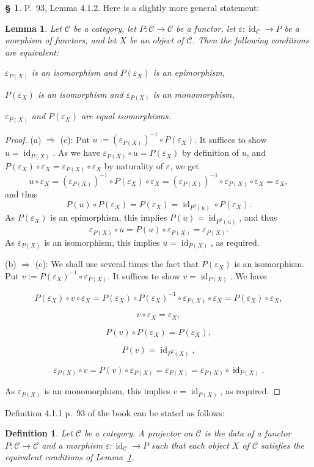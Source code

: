\documentclass[12pt]{article}%
\newtheorem{lem}[thm]{Lemma}
\newtheorem{df}[thm]{Definition}%
\theoremstyle{remark}
\theoremstyle{definition}
\newtheorem{s}[thm]{\S}%
\newcommand{\nn}{\noindent}
\newcommand{\C}{\mathcal C}
\newcommand{\ee}{\varepsilon}
\newcommand{\then}{\Rightarrow}
\DeclareMathOperator{\id}{id}
\begin{document}
\begin{s}
P.~93, Lemma 4.1.2. Here is a slightly more general statement:

\begin{lem}\label{proj3}
Let $\C$ be a category, let $P:\C\to\C$ be a functor, let $\ee:\id_\C\to P$ be a morphism of functors, and let $X$ be an object of $\C$. Then the following conditions are equivalent:

\nn{\em(a)} $\ee_{P(X)}$ is an isomorphism and $P(\ee_X)$ is an epimorphism,

\nn{\em(b)} $P(\ee_X)$ is an isomorphism and $\ee_{P(X)}$ is an monomorphism,

\nn{\em(c)} $\ee_{P(X)}$ and $P(\ee_X)$ are equal isomorphisms.
\end{lem}

\begin{proof}
(a) $\then$ (c): Put $u:=(\ee_{P(X)})^{-1}\circ P(\ee_X)$. It suffices to show $u=\id_{P(X)}$. As we have $\ee_{P(X)}\circ u=P(\ee_X)$ by definition of $u$, and $P(\ee_X)\circ\ee_X=\ee_{P(X)}\circ\ee_X$ by naturality of $\ee$, we get 
$$
u\circ\ee_X=(\ee_{P(X)})^{-1}\circ P(\ee_X)\circ\ee_X=(\ee_{P(X)})^{-1}\circ\ee_{P(X)}\circ\ee_X=\ee_X,
$$ 
and thus 
$$
P(u)\circ P(\ee_X)=P(\ee_X)=\id_{P^2(u)}\circ P(\ee_X).
$$
As $P(\ee_X)$ is an epimorphism, this implies $P(u)=\id_{P^2(u)}$, and thus 
$$
\ee_{P(X)}\circ u=P(u)\circ \ee_{P(X)}=\ee_{P(X)}.
$$ 
As $\ee_{P(X)}$ is an isomorphism, this implies $u=\id_{P(X)}$, as required.

\nn(b) $\then$ (c): We shall use several times the fact that $P(\ee_X)$ is an isomorphism. Put $v:=P(\ee_X)^{-1}\circ\ee_{P(X)}$. It suffices to show $v=\id_{P(X)}$. We have 

$$
P(\ee_X)\circ v\circ\ee_X=P(\ee_X)\circ P(\ee_X)^{-1}\circ\ee_{P(X)}\circ\ee_X=P(\ee_X)\circ\ee_X,
$$ 

$$
v\circ\ee_X=\ee_X,
$$

$$
P(v)\circ P(\ee_X)=P(\ee_X),
$$

$$
P(v)=\id_{P^2(X)},
$$

$$
\ee_{P(X)}\circ v=P(v)\circ\ee_{P(X)}=\ee_{P(X)}=\ee_{P(X)}\circ\id_{P(X)}.
$$ 

\nn As $\ee_{P(X)}$ is an monomorphism, this implies $v=\id_{P(X)}$, as required.
\end{proof}

Definition 4.1.1 p.~93 of the book can be stated as follows:

\begin{df}
Let $\C$ be a category. A {\em projector}  on $\C$ is the data of a functor $P:\C\to\C$ and a morphism $\ee:\id_\C\to P$ such that each object $X$ of $\C$ satisfies the equivalent conditions of Lemma~\ref{proj3}. 
\end{df}
\end{s}
\end{document}

